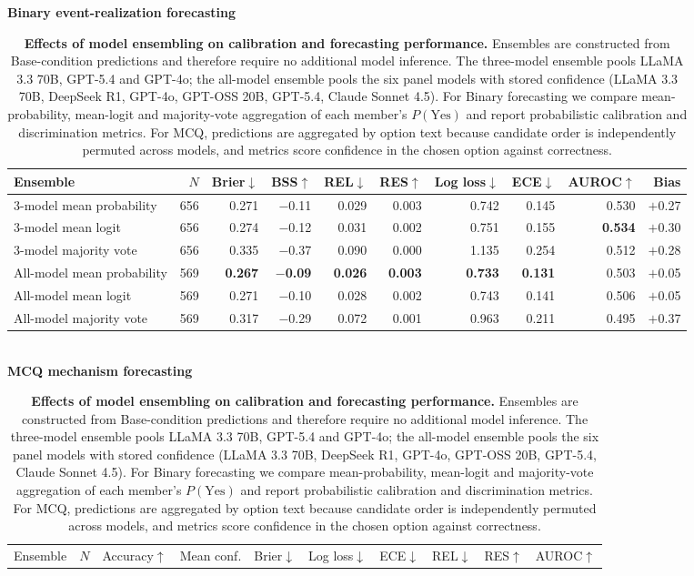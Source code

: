 \begin{table}[t]
\centering
\small
\caption{\textbf{Effects of model ensembling on calibration and forecasting performance.} Ensembles are constructed from Base-condition predictions and therefore require no additional model inference. The three-model ensemble pools LLaMA 3.3 70B, GPT-5.4 and GPT-4o; the all-model ensemble pools the six panel models with stored confidence (LLaMA 3.3 70B, DeepSeek R1, GPT-4o, GPT-OSS 20B, GPT-5.4, Claude Sonnet 4.5). For Binary forecasting we compare mean-probability, mean-logit and majority-vote aggregation of each member's $P(\mathrm{Yes})$ and report probabilistic calibration and discrimination metrics. For MCQ, predictions are aggregated by option text because candidate order is independently permuted across models, and metrics score confidence in the chosen option against correctness.}
\label{tab:ensemble}
\vspace{2pt}\textbf{Binary event-realization forecasting}\\[2pt]
\begin{tabular}{l r rrrrrrrr}
\toprule
Ensemble & $N$ & Brier$\downarrow$ & BSS$\uparrow$ & REL$\downarrow$ & RES$\uparrow$ & Log loss$\downarrow$ & ECE$\downarrow$ & AUROC$\uparrow$ & Bias \\
\midrule
3-model mean probability & 656 & 0.271 & $-$0.11 & 0.029 & 0.003 & 0.742 & 0.145 & 0.530 & $+$0.27 \\
3-model mean logit & 656 & 0.274 & $-$0.12 & 0.031 & 0.002 & 0.751 & 0.155 & \textbf{0.534} & $+$0.30 \\
3-model majority vote & 656 & 0.335 & $-$0.37 & 0.090 & 0.000 & 1.135 & 0.254 & 0.512 & $+$0.28 \\
All-model mean probability & 569 & \textbf{0.267} & \textbf{$-$0.09} & \textbf{0.026} & \textbf{0.003} & \textbf{0.733} & \textbf{0.131} & 0.503 & $+$0.05 \\
All-model mean logit & 569 & 0.271 & $-$0.10 & 0.028 & 0.002 & 0.743 & 0.141 & 0.506 & $+$0.05 \\
All-model majority vote & 569 & 0.317 & $-$0.29 & 0.072 & 0.001 & 0.963 & 0.211 & 0.495 & $+$0.37 \\
\bottomrule
\end{tabular}
\\[8pt]
\textbf{MCQ mechanism forecasting}\\[2pt]
\begin{tabular}{l r rrrrrrrr}
\toprule
Ensemble & $N$ & Accuracy$\uparrow$ & Mean conf. & Brier$\downarrow$ & Log loss$\downarrow$ & ECE$\downarrow$ & REL$\downarrow$ & RES$\uparrow$ & AUROC$\uparrow$ \\

\end{tabular}
\end{table}
